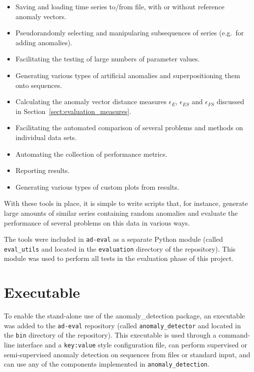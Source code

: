 \begin{itemize}
    \item Saving and loading time series to/from file, with or without reference anomaly vectors.
    \item Pseudorandomly selecting and manipularing subsequences of series (e.g.\ for adding anomalies).
    \item Facilitating the testing of large numbers of parameter values.
    \item Generating various types of artificial anomalies and superpositioning them onto sequences.
    \item Calculating the anomaly vector distance measures $\epsilon_E$, $\epsilon_{ES}$ and $\epsilon_{FS}$ discussed in Section~\ref{sect:evaluation_measures}.
    \item Facilitating the automated comparison of several problems and methods on individual data sets.
    \item Automating the collection of performance metrics.
    \item Reporting results.
    \item Generating various types of custom plots from results.
\end{itemize}

With these tools in place, it is simple to write scripts that, for instance, generate large amounts of similar series containing random anomalies and evaluate the performance of several problems on this data in various ways. 

The tools were included in \texttt{ad-eval} as a separate Python module (called \texttt{eval\_utils} and located in the \texttt{evaluation} directory of the repository). This module was used to perform all tests in the evaluation phase of this project.

\section{Executable}
\label{sect:executable}

To enable the stand-alone use of the anomaly\_detection package, an executable was added to the \texttt{ad-eval} repository (called \texttt{anomaly\_detector} and located in the \texttt{bin} directory of the repository). This executable is used through a command-line interface and a \texttt{key:value} style configuration file, can perform supervised or semi-supervised anomaly detection on sequences from files or standard input, and can use any of the components implemented in \texttt{anomaly\_detection}.

